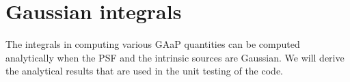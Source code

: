 \documentclass[DM,lsstdraft, authoryear,toc]{lsstdoc}
\newcommand{\rmd}{\mathrm{d}^2}
\begin{document}

\section{Gaussian integrals}
The integrals in computing various GAaP quantities can be computed analytically when the PSF and the intrinsic sources are Gaussian.
We will derive the analytical results that are used in the unit testing of the code.
\end{document}
